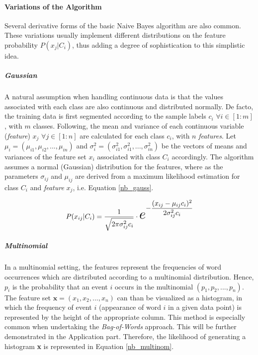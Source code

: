 	\paragraph{Variations of the Algorithm}
		Several derivative forms of the basic Naive Bayes algorithm are also common. These variations usually implement different distributions on the feature probability $ P(x_j|C_i) $, thus adding a degree of sophistication to this simplistic idea.
		
		\subparagraph{Gaussian}
			A natural assumption when handling continuous data is that the values associated with each class are also continuous and distributed normally. De facto, the training data is first segmented according to the sample labels $ c_i$   $\forall  i \in [1:m] $, with $ m $ classes. Following, the mean and variance of each continuous variable (\textit{feature}) $ x_j $ $\forall  j \in [1:n] $ are calculated for each class  $ c_i $, with $ n $ \textit{features}. Let $ \mu_i = (\mu_{i1},\mu_{i2}, ... ,\mu_{in}) $ and $ \sigma_i^2 = (\sigma_{i1}^2,\sigma_{i1}^2 ,..., \sigma_{in}^2) $ be the vectors of means and variances of the feature set $ x_i $ associated with class $ C_i $ accordingly. The algorithm assumes a normal (Gaussian) distribution for the features, where as the parameters $ \sigma_{ij} $ and $ \mu_{ij} $ are derived from a maximum likelihood estimation for class $ C_i $ and \textit{feature} $ x_j $, i.e. Equation \ref{nb_gauss}.
	
		\begin{equation}
			P(x_{ij}|C_i) = \frac{1}{\sqrt{\vphantom{\frac{1}{1}} 2 \pi \sigma^2_{ij} c_i}} \cdot 
			\scaleobj{2}{e}^{ \displaystyle - \frac{(x_{ij}-\mu_{ij} c_i)^2}{2 \sigma^2_{ij} c_i} }
			\label{nb_gauss}
		\end{equation}
	
		\subparagraph{Multinomial}
			In a multinomial setting, the features represent the frequencies of word occurrences which are distributed according to a multinomial distribution. Hence, $ p_i $ is the probability that an event $ i $ occurs in the multinomial $ (p_1,p_2, ...,p_n) $. The feature set $ \textbf{x} = (x_1,x_2, ...,x_n) $ can than be visualized as a histogram, in which the frequency of event $ i $ (appearance of word $ i $ in a given data point) is represented by the height of the appropriate column. This method is especially common when undertaking the \textit{Bag-of-Words} approach. This will be further demonstrated in the Application part. Therefore, the likelihood of generating a histogram \textbf{x} is represented in Equation \ref{nb_multinom}.
	
